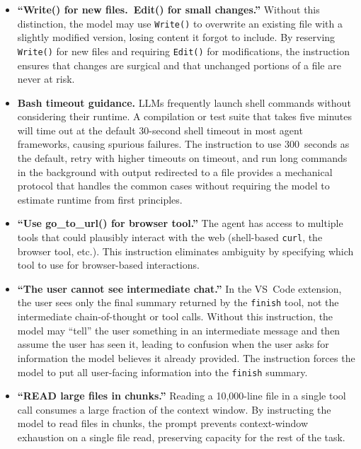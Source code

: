 \documentclass{article}
\begin{document}
\begin{itemize}[nosep]
\item \textbf{``Write() for new files.\ Edit() for small changes.''}
  Without this distinction, the model may use \texttt{Write()} to
  overwrite an existing file with a slightly modified version, losing
  content it forgot to include.  By reserving \texttt{Write()} for new
  files and requiring \texttt{Edit()} for modifications, the
  instruction ensures that changes are surgical and that unchanged
  portions of a file are never at risk.

\item \textbf{Bash timeout guidance.}  LLMs frequently launch shell
  commands without considering their runtime.  A compilation or test
  suite that takes five minutes will time out at the default
  30-second shell timeout in most agent frameworks, causing spurious
  failures.  The instruction to use 300~seconds as the default, retry
  with higher timeouts on timeout, and run long commands in the
  background with output redirected to a file provides a mechanical
  protocol that handles the common cases without requiring the model
  to estimate runtime from first principles.

\item \textbf{``Use go\_to\_url() for browser tool.''}  The agent has
  access to multiple tools that could plausibly interact with the web
  (shell-based \texttt{curl}, the browser tool, etc.).  This
  instruction eliminates ambiguity by specifying which tool to use for
  browser-based interactions.

\item \textbf{``The user cannot see intermediate chat.''}  In the
  VS~Code extension, the user sees only the final summary returned by
  the \texttt{finish} tool, not the intermediate chain-of-thought or
  tool calls.  Without this instruction, the model may ``tell'' the
  user something in an intermediate message and then assume the user
  has seen it, leading to confusion when the user asks for information
  the model believes it already provided.  The instruction forces the
  model to put all user-facing information into the \texttt{finish}
  summary.

\item \textbf{``READ large files in chunks.''}  Reading a
  10,000-line file in a single tool call consumes a large fraction of
  the context window.  By instructing the model to read files in
  chunks, the prompt prevents context-window exhaustion on a single
  file read, preserving capacity for the rest of the task.


\end{itemize}
\end{document}
